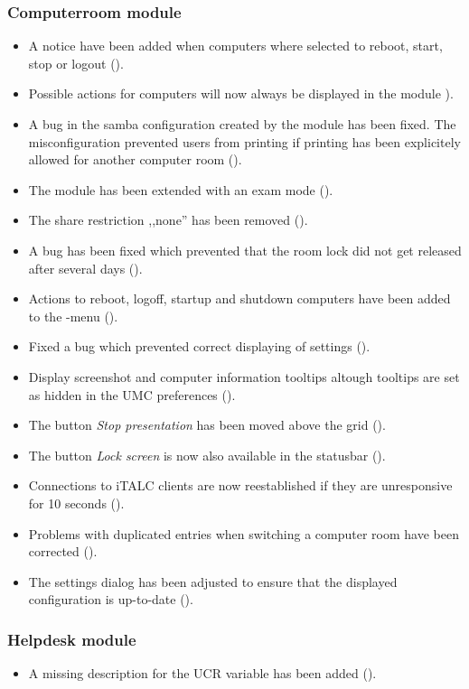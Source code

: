 \subsubsection{Computerroom module}
\begin{itemize}
\item A notice have been added when computers where selected to reboot, start, stop or logout ().
\item Possible actions for computers will now always be displayed in the  module ).
\item A bug in the samba configuration created by the  module has been fixed. The
  misconfiguration prevented users from printing if printing has been explicitely allowed for another computer
  room ().
\item The  module has been extended with an exam mode ().
\item The share restriction ,,none'' has been removed ().
\item A bug has been fixed which prevented that the room lock did not get released after several days ().
\item Actions to reboot, logoff, startup and shutdown computers have been added to the -menu ().
\item Fixed a bug which prevented correct displaying of  settings ().
\item Display screenshot and computer information tooltips altough tooltips are set as hidden in the UMC preferences ().
\item The button \emph{Stop presentation} has been moved above the grid ().
\item The button \emph{Lock screen} is now also available in the statusbar ().
\item Connections to iTALC clients are now reestablished if they are unresponsive for 10 seconds ().
\item Problems with duplicated entries when switching a computer room have been corrected ().
\item The settings dialog has been adjusted to ensure that the displayed configuration is up-to-date ().
\end{itemize}

\subsubsection{Helpdesk module}
\begin{itemize}
\item A missing description for the UCR variable  has been added ().
\end{itemize}


